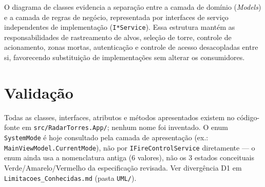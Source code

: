 O diagrama de classes evidencia a separação entre a camada de domínio (\emph{Models}) e a camada
de regras de negócio, representada por interfaces de serviço independentes de implementação
(\texttt{I*Service}). Essa estrutura mantém as responsabilidades de rastreamento de alvos,
seleção de torre, controle de acionamento, zonas mortas, autenticação e controle de acesso
desacopladas entre si, favorecendo substituição de implementações sem alterar os consumidores.

\section{Validação}

Todas as classes, interfaces, atributos e métodos apresentados existem no código-fonte em
\texttt{src/RadarTorres.App/}; nenhum nome foi inventado. O enum \texttt{SystemMode} é hoje
consultado pela camada de apresentação (ex.: \texttt{MainViewModel.CurrentMode}), não por
\texttt{IFireControlService} diretamente --- o enum ainda usa a nomenclatura antiga (6 valores),
não os 3 estados conceituais Verde/Amarelo/Vermelho da especificação revisada. Ver divergência D1
em \texttt{Limitacoes\_Conhecidas.md} (pasta \texttt{UML/}).
